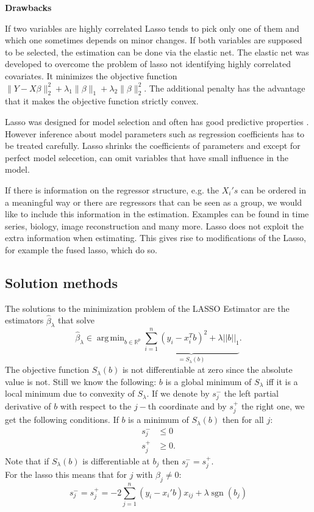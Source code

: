 \documentclass{article}
\theoremstyle{definition}
\DeclareMathOperator*{\argmin}{arg\,min}
\DeclareMathOperator*{\sgn}{sgn}
\begin{document}
\noindent\textbf{Drawbacks} \newline

\noindent If two variables are highly correlated Lasso tends to pick only one of them and which one sometimes depends on minor changes.  If both variables are supposed to be selected, the estimation can be done via the elastic net. The elastic net was developed to overcome the problem of lasso not identifying highly correlated covariates. It minimizes the objective function $\| Y-X\beta\|_2^2+\lambda_1 \| \beta\|_1 +\lambda_2\|\beta\|_2^2$. The additional penalty has the advantage that it makes the objective function strictly convex.

Lasso was designed for model selection and often has good predictive properties \citep{belloni2014}. However inference about model parameters such as regression coefficients has to be treated carefully. Lasso shrinks the coefficients of parameters and except for perfect model selecetion, can omit variables that have small influence in the model.

If there is information on the regressor structure, e.g. the $X_i's$ can be ordered in a meaningful way or there are regressors that can be seen as a group, we would like to include this information in the estimation. Examples can be found in time series, biology, image reconstruction and many more.
Lasso does not exploit the extra information when estimating. This gives rise to modifications of the Lasso, for example the fused lasso, which do so. 

\subsection{Solution methods}


The solutions to the minimization problem of the LASSO Estimator are the estimators $\hat\beta_\lambda$ that solve
$$\hat\beta_\lambda \in \argmin_{b\in \mathbb{R}^p}\underbrace{\sum_{i=1}^{n}(y_i-x_i^Tb)^2+\lambda||b||_1}_{=S_\lambda (b)}.$$
%
The objective function $S_\lambda(b)$ is not differentiable at zero since the absolute value is not. Still we know the following: $b$ is a global minimum of $S_\lambda$ iff it is a local minimum due to convexity of $S_\lambda$. If we denote by $s_j^{-}$ the left partial derivative of $b$ with respect to the $j-$th coordinate and by $s_j^{+}$ the right one, we get the following conditions. If $b$ is a minimum of $S_\lambda(b)$ then for all $j$:
\begin{align*}
	s_j^{-} &\leq 0 \\
	s_j^{+} &\geq 0.
\end{align*}
Note that if $S_\lambda(b)$ is differentiable at $b_j$ then $s_j^{-} = s_j^{+}$.\\
For the lasso this means that for $j$ with $\beta_j \neq 0$:
\begin{equation}
	s_j^{-} = s_j^{+} = -2 \sum_{j=1}^{n} (y_i -x_i'b) x_{ij} + \lambda \sgn(b_j)
\end{equation}
\end{document}
